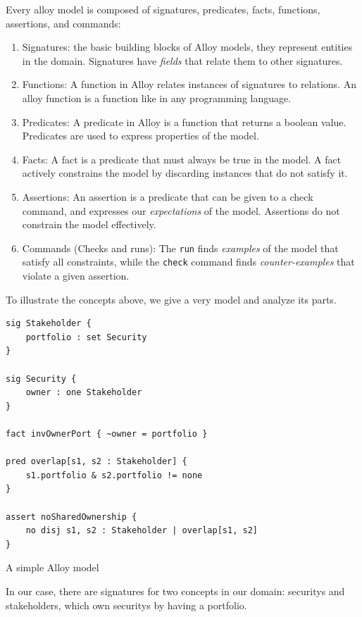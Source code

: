 Every alloy model is composed of signatures, predicates, facts, functions, assertions, and commands:

\begin{enumerate}
	\item Signatures: the basic building blocks of Alloy models, they represent entities in the domain. Signatures have \textit{fields} that relate them to other signatures.
	\item Functions: A function in Alloy relates instances of signatures to relations. An alloy function is a function like in any programming language.
	\item Predicates: A predicate in Alloy is a function that returns a boolean value. Predicates are used to express properties of the model.
	\item Facts: A fact is a predicate that must always be true in the model. A fact actively constrains the model by discarding instances that do not satisfy it.
	\item Assertions: An assertion is a predicate that can be given to a check command, and expresses our \textit{expectations} of the model. Assertions do not constrain the model effectively.
	\item Commands (Checks and runs): The \verb|run| finds \textit{examples} of the model that satisfy all constraints, while the \verb|check| command finds \textit{counter-examples} that violate a given assertion.
\end{enumerate}

To illustrate the concepts above, we give a very model and analyze its parts.

\begin{listing}[H]
\begin{verbatim}
sig Stakeholder {
    portfolio : set Security
}

sig Security {
    owner : one Stakeholder
}

fact invOwnerPort { ~owner = portfolio }

pred overlap[s1, s2 : Stakeholder] {
    s1.portfolio & s2.portfolio != none
}

assert noSharedOwnership {
    no disj s1, s2 : Stakeholder | overlap[s1, s2]
}
\end{verbatim}
\caption{A simple Alloy model}
\label{lst:alloy-model}
\end{listing}

In our case, there are signatures for two concepts in our domain: \glspl{security} and stakeholders, which own \glspl{security} by having a portfolio.

